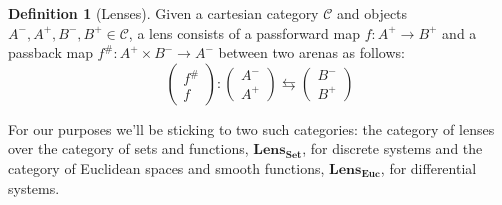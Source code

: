 \documentclass[12pt]{article}
\theoremstyle{definition}
\newtheorem{definition}{Definition}
\begin{document}
\begin{definition}[Lenses]
    Given a cartesian category $\mathcal{C}$ and objects $A^-, A^+, B^-, B^+ \in\mathcal{C}$, a lens consists of a passforward map $f:A^+\rightarrow B^+$ and a passback map $f^\#:A^+ \times B^- \rightarrow A^-$ between two arenas as follows:
    \[
        \begin{pmatrix}f^{\#}\\f\end{pmatrix}:\begin{pmatrix}A^-\\A^+\end{pmatrix}\leftrightarrows\begin{pmatrix}B^-\\B^+\end{pmatrix}
    \]
\end{definition}

For our purposes we'll be sticking to two such categories: the category of lenses over the category of sets and functions, $\textbf{Lens}_{\textbf{Set}}$, for discrete systems and the category of Euclidean spaces and smooth functions, $\textbf{Lens}_\textbf{Euc}$, for differential systems.
\end{document}
